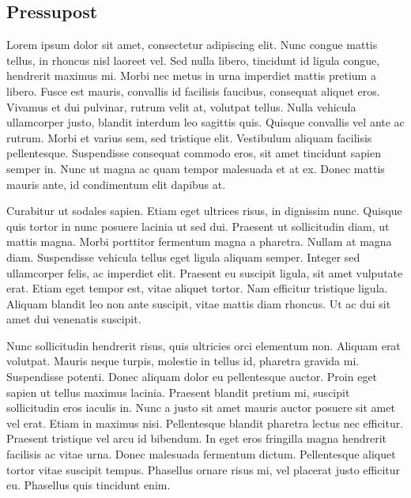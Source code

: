 \documentclass[a4paper,12pt,twoside]{ThesisStyle}
\newcommand{\appendixmark}{Annex} %
\begin{document}


\renewcommand\appendixname{Annex} %

\begin{appendices}

\chapter{Pressupost}

Lorem ipsum dolor sit amet, consectetur adipiscing elit. Nunc congue mattis tellus, in rhoncus nisl laoreet vel. Sed nulla libero, tincidunt id ligula congue, hendrerit maximus mi. Morbi nec metus in urna imperdiet mattis pretium a libero. Fusce est mauris, convallis id facilisis faucibus, consequat aliquet eros. Vivamus et dui pulvinar, rutrum velit at, volutpat tellus. Nulla vehicula ullamcorper justo, blandit interdum leo sagittis quis. Quisque convallis vel ante ac rutrum. Morbi et varius sem, sed tristique elit. Vestibulum aliquam facilisis pellentesque. Suspendisse consequat commodo eros, sit amet tincidunt sapien semper in. Nunc ut magna ac quam tempor malesuada et at ex. Donec mattis mauris ante, id condimentum elit dapibus at.

Curabitur ut sodales sapien. Etiam eget ultrices risus, in dignissim nunc. Quisque quis tortor in nunc posuere lacinia ut sed dui. Praesent ut sollicitudin diam, ut mattis magna. Morbi porttitor fermentum magna a pharetra. Nullam at magna diam. Suspendisse vehicula tellus eget ligula aliquam semper. Integer sed ullamcorper felis, ac imperdiet elit. Praesent eu suscipit ligula, sit amet vulputate erat. Etiam eget tempor est, vitae aliquet tortor. Nam efficitur tristique ligula. Aliquam blandit leo non ante suscipit, vitae mattis diam rhoncus. Ut ac dui sit amet dui venenatis suscipit.

Nunc sollicitudin hendrerit risus, quis ultricies orci elementum non. Aliquam erat volutpat. Mauris neque turpis, molestie in tellus id, pharetra gravida mi. Suspendisse potenti. Donec aliquam dolor eu pellentesque auctor. Proin eget sapien ut tellus maximus lacinia. Praesent blandit pretium mi, suscipit sollicitudin eros iaculis in. Nunc a justo sit amet mauris auctor posuere sit amet vel erat. Etiam in maximus nisi. Pellentesque blandit pharetra lectus nec efficitur. Praesent tristique vel arcu id bibendum. In eget eros fringilla magna hendrerit facilisis ac vitae urna. Donec malesuada fermentum dictum. Pellentesque aliquet tortor vitae suscipit tempus. Phasellus ornare risus mi, vel placerat justo efficitur eu. Phasellus quis tincidunt enim.


\end{appendices}
\end{document}

